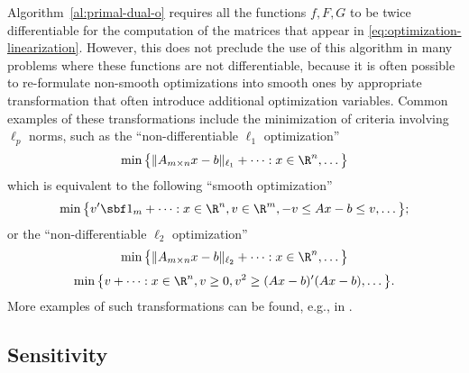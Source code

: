 \documentclass[11pt]{article}
\begin{document}
\begin{remark}[Smoothness]
  Algorithm~\ref{al:primal-dual-o} requires all the functions $f,F,G$ to
  be twice differentiable for the computation of the matrices that
  appear in \eqref{eq:optimization-linearization}. However, this does
  not preclude the use of this algorithm in many problems where these
  functions are not differentiable, because it is often possible to
  re-formulate non-smooth optimizations into smooth ones by
  appropriate transformation that often introduce additional
  optimization variables. Common examples of these transformations
  include the minimization of criteria involving $\ell_p$ norms, such as
  the ``non-differentiable $\ell_1$ optimization''
  \begin{align*}
    \min \big\{ \|A_{m\times n}x-b\|_{\ell_1}+\cdots: x\in\R^n,\dots \big\}
  \end{align*}
  which is equivalent to the following ``smooth optimization''
  \begin{align*}
    \min \big\{v'\sbf 1_m +\cdots:x\in\R^n,v\in\R^m, -v\le Ax-b\le v,\dots\big\};
  \end{align*}
  or the ``non-differentiable $\ell_2$ optimization''
  \begin{align*}
    \min \big\{\|A_{m\times n}x-b\|_{\ell_2}+\cdots: x\in\R^n,\dots\big\}
  \end{align*}
  \begin{align*}
    \min \big\{v +\cdots:x\in\R^n,v\ge0, v^2\ge (Ax-b)'(Ax-b),\dots \big\}.
  \end{align*}
  More examples of such transformations can be found, e.g., in
  \cite{GrantBoyd2008}. \frqed
\end{remark}

\subsection{Sensitivity}
\end{document}
